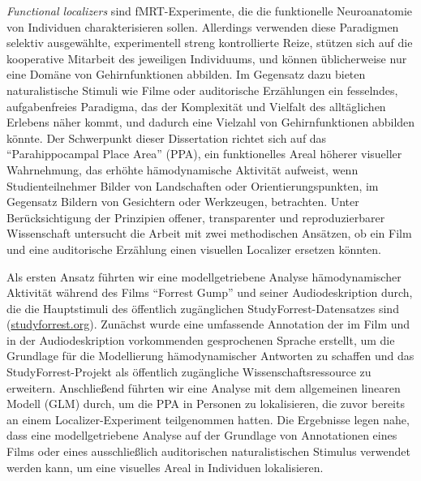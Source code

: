 \textit{Functional localizers} sind fMRT-Experimente, die die funktionelle
Neuroanatomie von Individuen charakterisieren sollen.
Allerdings verwenden diese Paradigmen selektiv ausgewählte, experimentell
streng kontrollierte Reize, stützen sich auf die kooperative Mitarbeit des
jeweiligen Individuums, und können üblicherweise nur eine Domäne von
Gehirnfunktionen abbilden.
%
Im Gegensatz dazu bieten naturalistische Stimuli wie Filme oder auditorische
Erzählungen ein fesselndes, aufgabenfreies Paradigma, das der Komplexität und
Vielfalt des alltäglichen Erlebens näher kommt, und dadurch eine Vielzahl von
Gehirnfunktionen abbilden könnte.
Der Schwerpunkt dieser Dissertation richtet sich auf das ``Parahippocampal
Place Area'' (PPA), ein funktionelles Areal höherer visueller Wahrnehmung, das
erhöhte hämodynamische Aktivität aufweist, wenn Studienteilnehmer Bilder von
Landschaften oder Orientierungspunkten, im Gegensatz Bildern von Gesichtern
oder Werkzeugen, betrachten.
%
Unter Berücksichtigung der Prinzipien offener, transparenter und
reproduzierbarer Wissenschaft untersucht die Arbeit mit zwei methodischen
Ansätzen, ob ein Film und eine auditorische Erzählung einen visuellen Localizer
ersetzen könnten.

Als ersten Ansatz führten wir eine modellgetriebene Analyse hämodynamischer
Aktivität während des Films ``Forrest Gump'' und seiner Audiodeskription durch,
die die Hauptstimuli des öffentlich zugänglichen StudyForrest-Datensatzes sind
(\href{www.studyforrest.org}{\url{studyforrest.org}}).
%
Zunächst wurde eine umfassende Annotation der im Film und in der
Audiodeskription vorkommenden gesprochenen Sprache erstellt, um die Grundlage
für die Modellierung hämodynamischer Antworten zu schaffen und das
StudyForrest-Projekt als öffentlich zugängliche Wissenschaftsressource zu
erweitern.
%
Anschließend führten wir eine Analyse mit dem allgemeinen
linearen Modell (GLM) durch, um die PPA in Personen zu lokalisieren, die zuvor
bereits an einem Localizer-Experiment teilgenommen hatten.
Die Ergebnisse legen nahe, dass eine modellgetriebene Analyse auf der Grundlage
von Annotationen eines Films oder eines ausschließlich auditorischen
naturalistischen Stimulus verwendet werden kann, um eine visuelles Areal in
Individuen lokalisieren.


